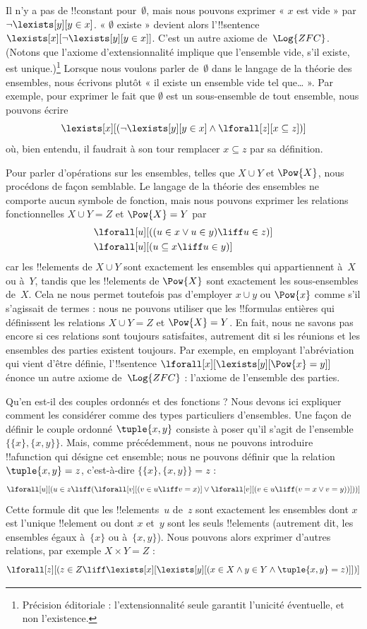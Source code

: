 \documentclass[../../../include/open-logic-section]{subfiles}
\begin{document}
Il n'y a pas de !!{constant} pour~$\emptyset$, mais nous pouvons
exprimer « $x$ est vide » par $\lnot \lexists[y][y \in x]$.
« $\emptyset$ existe » devient alors l'!!{sentence}
$\lexists[x][\lnot \lexists[y][y \in x]]$. C'est un autre axiome
de~$\Log{ZFC}$. (Notons que l'axiome d'extensionnalité implique
que l'ensemble vide, s'il existe, est unique.)\footnote{Précision éditoriale : l'extensionnalité seule garantit l'unicité éventuelle, et non l'existence.} Lorsque nous voulons
parler de~$\emptyset$ dans le langage de la théorie des ensembles,
nous écrivons plutôt « il existe un ensemble vide tel que… ».
Par exemple, pour exprimer le fait que $\emptyset$ est un
sous-ensemble de tout ensemble, nous pouvons écrire
\[
\lexists[x][(\lnot\lexists[y][y \in x] \land \lforall[z][x \subseteq
    z])]
\]
où, bien entendu, il faudrait à son tour remplacer $x \subseteq z$
par sa définition.

Pour parler d'opérations sur les ensembles, telles que $X \cup Y$
et $\Pow{X}$, nous procédons de façon semblable. Le langage de la
théorie des ensembles ne comporte aucun symbole de fonction, mais
nous pouvons exprimer les relations fonctionnelles $X \cup Y = Z$
et $\Pow{X} = Y$ par
\begin{align*}
& \lforall[u][((u \in x \lor u \in y) \liff u \in z)]\\
& \lforall[u][(u \subseteq x \liff u \in y )]
\end{align*}
car les !!{element}s de $X \cup Y$ sont exactement les ensembles
qui appartiennent à~$X$ ou à~$Y$, tandis que les !!{element}s de
$\Pow{X}$ sont exactement les sous-ensembles de~$X$. Cela ne nous
permet toutefois pas d'employer $x \cup y$ ou $\Pow{x}$ comme s'il
s'agissait de termes : nous ne pouvons utiliser que les !!{formula}s
entières qui définissent les relations $X \cup Y = Z$ et
$\Pow{X} = Y$. En fait, nous ne savons pas encore si ces relations
sont toujours satisfaites, autrement dit si les réunions et les
ensembles des parties existent toujours. Par exemple, en employant
l'abréviation qui vient d'être définie, l'!!{sentence}
$\lforall[x][\lexists[y][\Pow{x} = y]]$ énonce un autre axiome
de~$\Log{ZFC}$ : l'axiome de l'ensemble des parties.

Qu'en est-il des couples ordonnés et des fonctions ? Nous devons
ici expliquer comment les considérer comme des types particuliers
d'ensembles. Une façon de définir le couple ordonné $\tuple{x, y}$
consiste à poser qu'il s'agit de l'ensemble $\{\{x\}, \{x, y\}\}$.
Mais, comme précédemment, nous ne pouvons introduire !!a{function}
qui désigne cet ensemble; nous ne pouvons définir que la relation
$\tuple{x, y} = z$, c'est-à-dire $\{\{x\}, \{x, y\}\} = z$ :
\[
\lforall[u][(u \in z \liff (\lforall[v][(v \in u \liff v = x)] \lor
  \lforall[v][(v \in u \liff (v = x \lor v = y))]))]
\]
Cette formule dit que les !!{element}s~$u$ de~$z$ sont exactement
les ensembles dont $x$ est l'unique !!{element} ou dont $x$ et~$y$
sont les seuls !!{element}s (autrement dit, les ensembles égaux
à~$\{x\}$ ou à~$\{x, y\}$). Nous pouvons alors exprimer d'autres
relations, par exemple $X \times Y = Z$ :
\[
\lforall[z][(z \in Z \liff \lexists[x][\lexists[y][(x \in
        X \land y \in Y \land \tuple{x, y} = z)]])]
\]
\end{document}
